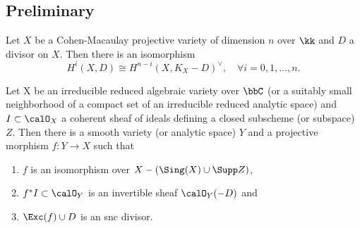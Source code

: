 \subsection{Preliminary}


    \begin{theorem}\label{thm: Serre duality for line bundles}
        Let \(X\) be a Cohen-Macaulay projective variety of dimension \(n\) over \(\kk\) and \(D\) a divisor on \(X\).
        Then there is an isomorphism
        \[
            H^i(X, D) \cong H^{n-i}(X, K_X - D)^\vee, \quad \forall i = 0, 1, \ldots, n.
        \]
    \end{theorem}


    \begin{theorem}\label{thm: log resolution of singularities}
        Let X be an irreducible reduced algebraic variety over $\bbC$ (or a suitably small neighborhood of a compact set of an irreducible reduced analytic space) and $I \subset \calO_X$ a coherent sheaf of ideals defining a closed subscheme (or subspace) $Z$. Then there is a smooth variety (or analytic space) $Y$ and a projective morphism $f: Y \to X$ such that
        \begin{enumerate}
            \item $f$ is an isomorphism over $X - (\Sing(X) \cup \Supp Z)$,
            \item $f^*I \subset \calO_Y$ is an invertible sheaf $\calO_Y(-D)$ and 
            \item $\Exc(f) \cup D$ is an snc divisor.
        \end{enumerate}
    \end{theorem}

